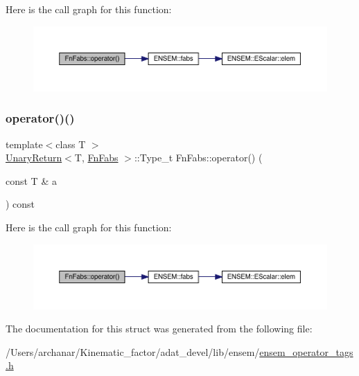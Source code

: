 Here is the call graph for this function\+:
\nopagebreak
\begin{figure}[H]
\begin{center}
\leavevmode
\includegraphics[width=350pt]{dd/d25/structFnFabs_a0813fbaa7b8028c3880585e4095fd2ca_cgraph}
\end{center}
\end{figure}
\mbox{\label{structFnFabs_a0813fbaa7b8028c3880585e4095fd2ca}} 
\subsubsection{\texorpdfstring{operator()()}{operator()()}\hspace{0.1cm}{\footnotesize\ttfamily [2/2]}}
{\footnotesize\ttfamily template$<$class T $>$ \\
\mbox{\hyperlink{structUnaryReturn}{Unary\+Return}}$<$T, \mbox{\hyperlink{structFnFabs}{Fn\+Fabs}} $>$\+::Type\+\_\+t Fn\+Fabs\+::operator() (\begin{DoxyParamCaption}\item[{const T \&}]{a }\end{DoxyParamCaption}) const\hspace{0.3cm}{\ttfamily [inline]}}

Here is the call graph for this function\+:
\nopagebreak
\begin{figure}[H]
\begin{center}
\leavevmode
\includegraphics[width=350pt]{dd/d25/structFnFabs_a0813fbaa7b8028c3880585e4095fd2ca_cgraph}
\end{center}
\end{figure}


The documentation for this struct was generated from the following file\+:\begin{DoxyCompactItemize}
\item 
/\+Users/archanar/\+Kinematic\+\_\+factor/adat\+\_\+devel/lib/ensem/\mbox{\hyperlink{lib_2ensem_2ensem__operator__tags_8h}{ensem\+\_\+operator\+\_\+tags.\+h}}\end{DoxyCompactItemize}
